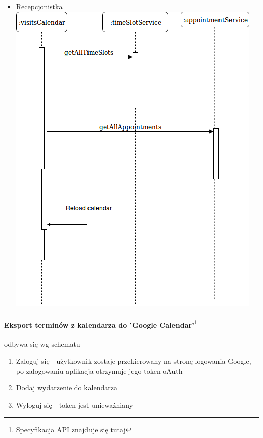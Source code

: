 \documentclass[polish,12pt]{aghthesis}
\begin{document}
\begin{itemize}
    \item Recepcjonistka \\
    \includegraphics[width=\textwidth]{cal-recep-init}
\end{itemize}



\paragraph{Eksport terminów z kalendarza do 'Google Calendar'\footnote{Specyfikacja API znajduje się \href{https://www.googleapis.com/discovery/v1/apis/calendar/v3/rest}{tutaj}}} odbywa się wg schematu
\begin{enumerate}
    \item Zaloguj się - użytkownik zostaje przekierowany na stronę logowania Google, po zalogowaniu aplikacja otrzymuje jego token oAuth
    \item Dodaj wydarzenie do kalendarza
    \item Wyloguj się - token jest unieważniany
\end{enumerate}
\end{document}
